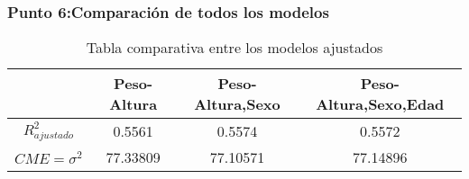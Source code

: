 \documentclass[12pt]{beamer}
\begin{document}
\begin{frame}
\frametitle{Punto 6:Comparación de todos los modelos}
\begin{table}[!htb]
\centering
\caption{Tabla comparativa entre los modelos ajustados}\label{Tabla1}
\resizebox{12cm}{!} {
\begin{tabular}{cccc}
\hline
 &Peso-Altura&Peso-Altura,Sexo&Peso-Altura,Sexo,Edad \\ 
\hline
$R^2_{ajustado}$ &0.5561&0.5574&0.5572 \\ 
 
$CME=\sigma^2$ &77.33809&77.10571&77.14896 \\ 
\hline 
\end{tabular}
}
\end{table}
\end{frame}
\end{document}
